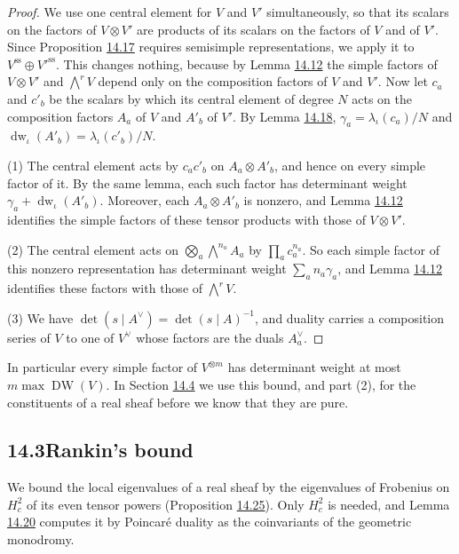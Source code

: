 \documentclass[11pt]{article}
\begin{document}
\begin{proof}[{Proof}]\label{bp100}%
We use one central element for \(V\) and \(V'\) simultaneously, so that its scalars on the factors of \(V\otimes V'\) are products of its scalars on the factors of \(V\) and of \(V'\). Since Proposition \hyperref[bp92]{14.17} requires semisimple representations, we apply it to \(V^{\mathrm{ss}}\oplus V'^{\mathrm{ss}}\). This changes nothing, because by Lemma \hyperref[bp78]{14.12} the simple factors of \(V\otimes V'\) and \(\bigwedge^rV\) depend only on the composition factors of \(V\) and \(V'\). Now let \(c_a\) and \(c'_b\) be the scalars by which its central element of degree \(N\) acts on the composition factors \(A_a\) of \(V\) and \(A'_b\) of \(V'\). By Lemma \hyperref[bp96]{14.18}, \(\gamma_a=\lambda_\iota(c_a)/N\) and \(\operatorname{dw}_\iota(A'_b)=\lambda_\iota(c'_b)/N\).

(1) The central element acts by \(c_ac'_b\) on \(A_a\otimes A'_b\), and hence on every simple factor of it. By the same lemma, each such factor has determinant weight \(\gamma_a+\operatorname{dw}_\iota(A'_b)\). Moreover, each \(A_a\otimes A'_b\) is nonzero, and Lemma \hyperref[bp78]{14.12} identifies the simple factors of these tensor products with those of \(V\otimes V'\).

(2) The central element acts on \(\bigotimes_a\bigwedge^{n_a}A_a\) by \(\prod_ac_a^{n_a}\). So each simple factor of this nonzero representation has determinant weight \(\sum_an_a\gamma_a\), and Lemma \hyperref[bp78]{14.12} identifies these factors with those of \(\bigwedge^rV\).

(3) We have \(\det(s\mid A^\vee)=\det(s\mid A)^{-1}\), and duality carries a composition series of \(V\) to one of \(V^\vee\) whose factors are the duals \(A_a^\vee\).
\end{proof}

\label{bp101}%
In particular every simple factor of \(V^{\otimes m}\) has determinant weight at most \(m\max\operatorname{DW}(V)\). In Section \hyperref[bp118]{14.4} we use this bound, and part (2), for the constituents of a real sheaf before we know that they are pure.



\subsection*{\texorpdfstring{14.3\quad Rankin's bound}{14.3 Rankin's bound}}
\label{bp102}%
\label{bp103}%
We bound the local eigenvalues of a real sheaf by the eigenvalues of Frobenius on \(H^2_c\) of its even tensor powers (Proposition \hyperref[bp116]{14.25}). Only \(H^2_c\) is needed, and Lemma \hyperref[bp104]{14.20} computes it by Poincaré duality as the coinvariants of the geometric monodromy.
\end{document}
